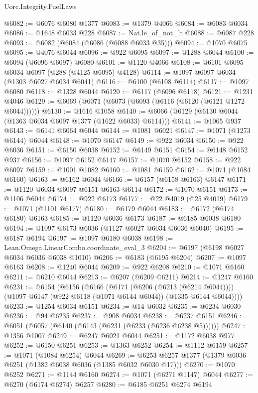 \begin{lexlean}{Uorc.Integrity.FuelLaws}
\begin{coremodule}
@6082 := @6076 @6080 @1377
@6083 := @1379 @4066
@6084 := @6083 @6034
@6086 := @1648 @6033 @228
@6087 := Nat.le_of_not_lt
@6088 := @6087 @228
@6093 := @6082 (@6084 (@6086 (@6088 @6033 @35)))
@6094 := @1070 @6075
@6095 := @4076 @6044
@6096 := @922 @6095
@6097 := @1288 @6044
@6100 := @6094 (@6096 @6097) @6080
@6101 := @1120 @4066
@6108 := @6101 @6095 @6034 @6097 (@288 (@4125 @6095) @4128)
@6114 := @1097 @6097 @6034 (@1303 @6027 @6034 @6041)
@6116 := @6100 (@6108 @6114)
@6117 := @1097 @6080
@6118 := @1328 @6044
@6120 := @6117 (@6096 @6118)
@6121 := @1231 @4046
@6129 := @6069 (@6071 (@6073 (@6093 (@6116 (@6120 (@6121 @1272 @6044))))))
@6130 := @1616 @1058
@6140 := @6066 (@6129 (@6130 @6044 (@1363 @6034 @6097 @1377 (@1622 @6033) @6114)))
@6141 := @1065 @937
@6143 := @6141 @6064 @6044
@6144 := @1081 @6021
@6147 := @1071 (@1273 @6144) @6044
@6148 := @1070 @6147
@6149 := @922 @6034
@6150 := @922 @6036
@6151 := @6150 @6038
@6152 := @6149 @6151
@6154 := @6148 @6152 @937
@6156 := @1097 @6152 @6147
@6157 := @1070 @6152
@6158 := @922 @6097
@6159 := @1001 @1082
@6160 := @1081 @6159
@6162 := @1071 (@1084 @6160)
@6163 := @6162 @6044
@6166 := @6157 (@6158 @6163) @6147
@6171 := @1120 @6034 @6097 @6151 @6163 @6114
@6172 := @1070 @6151
@6173 := @1106 @6044
@6174 := @922 @6173
@6177 := @22 @4019 (@25 @4019)
@6179 := @1071 (@1101 @6177)
@6180 := @6179 @6044
@6183 := @6172 (@6174 @6180) @6163
@6185 := @1120 @6036 @6173
@6187 := @6185 @6038 @6180
@6194 := @1097 @6173 @6036 (@1127 @6027 @6034 @6036 @6040)
@6195 := @6187 @6194
@6197 := @1097 @6180 @6038
@6198 := Lean.Omega.LinearCombo.coordinate_eval_3
@6204 := @6197 (@6198 @6027 @6034 @6036 @6038 @1010)
@6206 := @6183 (@6195 @6204)
@6207 := @1097 @6163
@6208 := @1240 @6044
@6209 := @922 @6208
@6210 := @1071 @6160
@6211 := @6210 @6044
@6213 := @6207 (@6209 @6211)
@6214 := @1247 @6160
@6231 := @6154
    (@6156
      (@6166
        (@6171 (@6206 (@6213 (@6214 @6044))))
        (@1097 @6147 (@922 @6118 (@1071 @6144 @6044)) (@1335 @6144 @6044))))
@6233 := @1254 @6034 @6151
@6234 := @14 @6032
@6235 := @6234 @6030
@6236 := @94 @6235
@6237 := @908 @6034
@6238 := @6237 @6151
@6246 := @6051 (@6057 (@6140 (@6143 (@6231 (@6233 (@6236 @6238 @5))))))
@6247 := @1356 @1007
@6249 := @6247 @6021 @6044
@6251 := @1172 @6038 @977
@6252 := @6150 @6251
@6253 := @1363 @6252
@6254 := @1112 @6159
@6257 := @1071 (@1084 @6254) @6044
@6269 := @6253 @6257 @1377 (@1379 @6036 @6251 (@1382 @6038 @6036 (@1385 @6032 @6030 @17)))
@6270 := @1070 @6252
@6271 := @1144 @6160
@6274 := @1071 (@6271 @1147) @6044
@6277 := @6270 (@6174 @6274) @6257
@6280 := @6185 @6251 @6274 @6194

\end{coremodule}
\end{lexlean}

